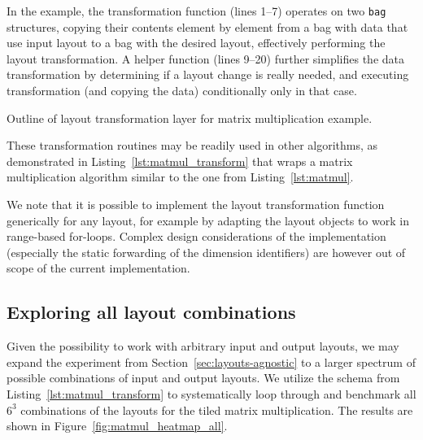 In the example, the transformation function (lines 1--7) operates on two \texttt{bag} structures, copying their contents element by element from a bag with data that use input layout to a bag with the desired layout, effectively performing the layout transformation. A helper function (lines 9--20) further simplifies the data transformation by determining if a layout change is really needed, and executing transformation (and copying the data) conditionally only in that case.

\begin{listing}
    \vspace{-10pt}
    \vspace{-20pt}
    \caption{Outline of layout transformation layer for matrix multiplication example.}
    \label{lst:matmul_transform}
\end{listing}

These transformation routines may be readily used in other algorithms, as demonstrated in Listing~\ref{lst:matmul_transform} that wraps a matrix multiplication algorithm similar to the one from Listing~\ref{lst:matmul}.

We note that it is possible to implement the layout transformation function generically for any layout, for example by adapting the layout objects to work in range-based for-loops. Complex design considerations of the implementation (especially the static forwarding of the dimension identifiers) are however out of scope of the current \Noarr{} implementation.

\subsection{Exploring all layout combinations}

Given the possibility to work with arbitrary input and output layouts, we may expand the experiment from Section~\ref{sec:layouts-agnostic} to a larger spectrum of possible combinations of input and output layouts. We utilize the schema from Listing~\ref{lst:matmul_transform} to systematically loop through and benchmark all $6^3$ combinations of the layouts for the tiled matrix multiplication. The results are shown in Figure~\ref{fig:matmul_heatmap_all}.

